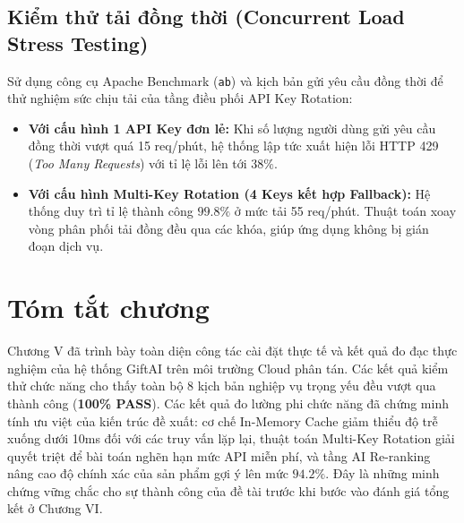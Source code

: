 \subsection{Kiểm thử tải đồng thời (Concurrent Load Stress Testing)}
Sử dụng công cụ Apache Benchmark (\texttt{ab}) và kịch bản gửi yêu cầu đồng thời để thử nghiệm sức chịu tải của tầng điều phối API Key Rotation:
\begin{itemize}
    \item \textbf{Với cấu hình 1 API Key đơn lẻ:} Khi số lượng người dùng gửi yêu cầu đồng thời vượt quá 15 req/phút, hệ thống lập tức xuất hiện lỗi HTTP 429 (\textit{Too Many Requests}) với tỉ lệ lỗi lên tới $38\%$.
    \item \textbf{Với cấu hình Multi-Key Rotation (4 Keys kết hợp Fallback):} Hệ thống duy trì tỉ lệ thành công $\mathbf{99.8\%}$ ở mức tải 55 req/phút. Thuật toán xoay vòng phân phối tải đồng đều qua các khóa, giúp ứng dụng không bị gián đoạn dịch vụ.
\end{itemize}

\section{Tóm tắt chương}
Chương V đã trình bày toàn diện công tác cài đặt thực tế và kết quả đo đạc thực nghiệm của hệ thống GiftAI trên môi trường Cloud phân tán. Các kết quả kiểm thử chức năng cho thấy toàn bộ 8 kịch bản nghiệp vụ trọng yếu đều vượt qua thành công (\textbf{100\% PASS}). Các kết quả đo lường phi chức năng đã chứng minh tính ưu việt của kiến trúc đề xuất: cơ chế In-Memory Cache giảm thiểu độ trễ xuống dưới 10ms đối với các truy vấn lặp lại, thuật toán Multi-Key Rotation giải quyết triệt để bài toán nghẽn hạn mức API miễn phí, và tầng AI Re-ranking nâng cao độ chính xác của sản phẩm gợi ý lên mức $94.2\%$. Đây là những minh chứng vững chắc cho sự thành công của đề tài trước khi bước vào đánh giá tổng kết ở Chương VI.